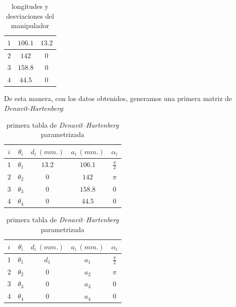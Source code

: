 \documentclass[a4paper,12pt]{article}
\begin{document}
\begin{table}[ht]
\begin{minipage}{.49\linewidth}
\begin{tabular}{|| c | c c ||}
            \hline\hline
            $1$ & $106.1$     & $13.2$      \\
            \hline
            $2$ & $142$       & $0$         \\
            \hline
            $3$ & $158.8$     & $0$         \\
            \hline
            $4$ & $44.5$      & $0$         \\ [1ex]
            \hline
        \end{tabular}
        \caption{longitudes y desviaciones del manipulador}
    \end{minipage}
\end{table}

De esta manera, con los datos obtenidos, generamos una primera matriz de \textit{Denavit-Hartenberg}:

\begin{table}[H]
    \parbox{.45\linewidth}{
        \centering
        \begin{tabular}{ c | c c c c }
            $i$ & $\theta_i$ & $d_i~(mm.)$ & $a_i~(mm.)$ & $\alpha_i$      \\ [0.5ex]
            \hline
            $1$ & $\theta_1$ & $13.2$      & $106.1$     & $\frac{\pi}{2}$ \\
            $2$ & $\theta_2$ & $0$         & $142$       & $\pi$           \\
            $3$ & $\theta_3$ & $0$         & $158.8$     & $0$             \\
            $4$ & $\theta_4$ & $0$         & $44.5$      & $0$             \\ [1ex]
        \end{tabular}
        \caption{primera tabla de \textit{Denavit–Hartenberg}}
    }
    \hfill
    \parbox{.45\linewidth}{
        \centering
        \begin{tabular}{ c | c c c c }
            $i$ & $\theta_i$ & $d_i~(mm.)$ & $a_i~(mm.)$ & $\alpha_i$      \\ [0.5ex]
            \hline
            $1$ & $\theta_1$ & $d_1$       & $a_1$       & $\frac{\pi}{2}$ \\
            $2$ & $\theta_2$ & $0$         & $a_2$       & $\pi$           \\
            $3$ & $\theta_3$ & $0$         & $a_3$       & $0$             \\
            $4$ & $\theta_4$ & $0$         & $a_4$       & $0$             \\ [1ex]
        \end{tabular}
        \caption{primera tabla de \textit{Denavit–Hartenberg} parametrizada}
    }
\end{table}
\end{document}
